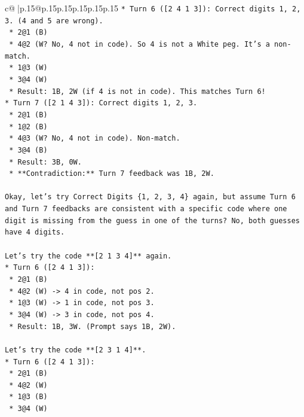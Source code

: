 \documentclass{article}
\begin{document}
{\begin{supertabular}{c@{$\;$}|p{.15\linewidth}@{}p{.15\linewidth}p{.15\linewidth}p{.15\linewidth}p{.15\linewidth}p{.15\linewidth}}
{{{\texttt{*   Turn 6 ({[}2 4 1 3{]}): Correct digits 1, 2, 3. (4 and 5 are wrong).} \\
\texttt{    *   2@1 (B)} \\
\texttt{    *   4@2 (W? No, 4 not in code). So 4 is not a White peg. It's a non{-}match.} \\
\texttt{    *   1@3 (W)} \\
\texttt{    *   3@4 (W)} \\
\texttt{    *   Result: 1B, 2W (if 4 is not in code). This matches Turn 6!} \\
\texttt{*   Turn 7 ({[}2 1 4 3{]}): Correct digits 1, 2, 3.} \\
\texttt{    *   2@1 (B)} \\
\texttt{    *   1@2 (B)} \\
\texttt{    *   4@3 (W? No, 4 not in code). Non{-}match.} \\
\texttt{    *   3@4 (B)} \\
\texttt{    *   Result: 3B, 0W.} \\
\texttt{    *   **Contradiction:** Turn 7 feedback was 1B, 2W.} \\
\\ 
\texttt{Okay, let's try Correct Digits \{1, 2, 3, 4\} again, but assume Turn 6 and Turn 7 feedbacks are consistent with a specific code where one digit is missing from the guess in one of the turns? No, both guesses have 4 digits.} \\
\\ 
\texttt{Let's try the code **{[}2 1 3 4{]}** again.} \\
\texttt{*   Turn 6 ({[}2 4 1 3{]}):} \\
\texttt{    *   2@1 (B)} \\
\texttt{    *   4@2 (W) {-}> 4 in code, not pos 2.} \\
\texttt{    *   1@3 (W) {-}> 1 in code, not pos 3.} \\
\texttt{    *   3@4 (W) {-}> 3 in code, not pos 4.} \\
\texttt{    *   Result: 1B, 3W. (Prompt says 1B, 2W).} \\
\\ 
\texttt{Let's try the code **{[}2 3 1 4{]}**.} \\
\texttt{*   Turn 6 ({[}2 4 1 3{]}):} \\
\texttt{    *   2@1 (B)} \\
\texttt{    *   4@2 (W)} \\
\texttt{    *   1@3 (B)} \\
\texttt{    *   3@4 (W)} \\
}}}
\end{supertabular}}
\end{document}
